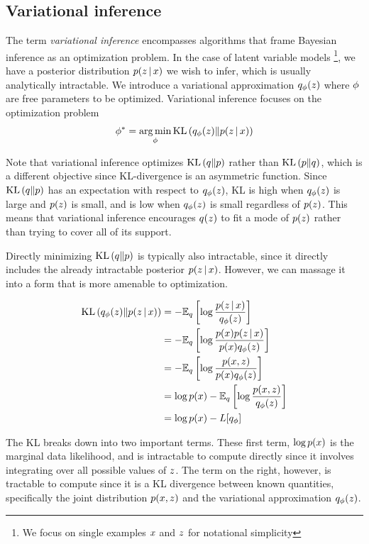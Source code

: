 \subsection{Variational inference}
The term \emph{variational inference}
encompasses algorithms
that frame Bayesian inference
as an optimization
problem. In the case
of latent variable models
\footnote{We focus on
single examples $x$ and $z$ for notational
simplicity},
we have a posterior distribution $p(z \,|\, x)$ we wish to
infer, which is
usually analytically intractable.
We introduce a variational approximation
$q_\phi(z)$ where $\phi$
are free parameters to be optimized.
Variational inference focuses on the 
optimization problem 
\begin{align*}
\phi^* = \operatorname*{arg\,min}_\phi \mathrm{KL}\left(q_\phi(z)\|p(z \,|\, x)\right)
\end{align*}

Note that variational inference optimizes $\mathrm{KL}\left(q\|p\right)$
rather than $\mathrm{KL}\left(p\|q\right)$, which is a different objective
since KL-divergence is an asymmetric function.
Since $\mathrm{KL}\left(q\|p\right)$ has an expectation with respect
to $q_\phi(z)$, KL
is high when $q_\phi(z)$ is large and $p(z)$ is
small, and is low when $q_\phi(z)$ is small
regardless of $p(z)$. This means that
variational inference encourages $q(z)$ to
fit a mode of $p(z)$ rather than trying to 
cover all of its support.

Directly minimizing $\mathrm{KL}\left(q\|p\right)$ is typically
also intractable, since it directly 
includes the already intractable posterior
$p(z \,|\, x)$. However, we can 
massage it into a form that is
more amenable to optimization.

\begin{align*}
    \mathrm{KL}\left(q_\phi(z)\|p(z \,|\, x)\right) &=  
    -\mathbb{E}_q \left[\log\frac{p(z \,|\, x)}{q_\phi(z)}\right] \\
    &= -\mathbb{E}_q\left[\log \frac{p(x)p(z \,|\, x)}{p(x)q_\phi(z)}\right] \\
    &= -\mathbb{E}_q\left[\log \frac{p(x, z)}{p(x)q_\phi(z)}\right] \\
    &= \log p(x) -\mathbb{E}_q\left[\log \frac{p(x, z)}{q_\phi(z)}\right] \\
    &= \log p(x) - L[q_\phi]
\end{align*}

The KL breaks down into two important terms.
These first term, $\log p(x)$
is the marginal data likelihood,
and is intractable to compute directly
since it involves integrating over all possible
values of $z$.
The term on the right, however,
is tractable to compute since 
it is a KL divergence between known quantities,
specifically the joint distribution $p(x, z)$
and the variational approximation $q_\phi(z)$. 

